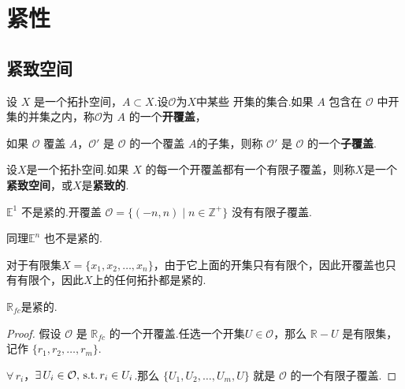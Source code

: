 \chapter{紧性}

\section{紧致空间}


\begin{definition}[开覆盖]
    设 $X$ 是一个拓扑空间，$A \subset X$.设$\mathcal{O}$为$X$中某些                                                                                            开集的集合.如果 $A$ 包含在 $\mathcal{O}$ 中开集的并集之内，称$\mathcal{O}$为 $A$ 的一个\textbf{开覆盖}，
\end{definition}

\begin{definition}[子覆盖]
    如果 $\mathcal{O}$ 覆盖 $A$，$\mathcal{O}'$ 是 $\mathcal{O}$ 的一个覆盖 $A$的子集，则称 $\mathcal{O}'$ 是 $\mathcal{O}$ 的一个\textbf{子覆盖}.
\end{definition}

\begin{definition}[紧致空间]
    设$X$是一个拓扑空间.如果 $X$ 的每一个开覆盖都有一个有限子覆盖，则称$X$是一个\textbf{紧致空间}，或$X$是\textbf{紧致的}.
\end{definition}

\begin{instance}
    $\mathbb{E}^1$ 不是紧的.开覆盖 $\mathcal{O} = \{(-n, n) \mid n \in \mathbb{Z}^+\}$ 没有有限子覆盖.\par
    同理$\mathbb{E}^n$ 也不是紧的.
\end{instance}

\begin{instance}
    对于有限集$X = \{x_1, x_2, \dots, x_n\}$，由于它上面的开集只有有限个，因此开覆盖也只有有限个，因此$X$上的任何拓扑都是紧的.
\end{instance}

\begin{instance}
    $\mathbb{R}_{fc}$是紧的.
    \begin{proof}
        假设 $\mathcal{O}$ 是 $\mathbb{R}_{fc}$ 的一个开覆盖.任选一个开集$U \in \mathcal{O}$，那么 $\mathbb{R} - U$ 是有限集，记作 $\{r_1, r_2, \dots, r_m\}$.\par
        $\forall\,r_i$，$\exists\,U_i \in \mathcal{O},\operatorname{\,\text{s.t.}} r_i \in U_i$.那么 $\{U_1, U_2, \dots, U_m, U\}$ 就是 $\mathcal{O}$ 的一个有限子覆盖.
    \end{proof}
\end{instance}

